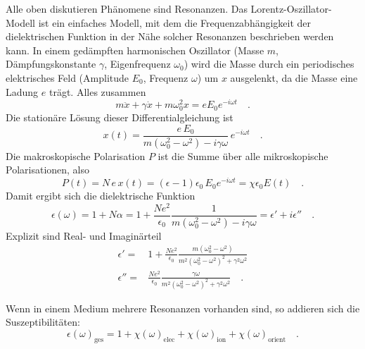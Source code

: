 Alle oben diskutieren Phänomene sind Resonanzen. Das Lorentz-Oszillator-Modell ist ein einfaches Modell, mit dem die Frequenzabhängigkeit der dielektrischen Funktion in der Nähe solcher Resonanzen beschrieben werden kann. In einem gedämpften harmonischen Oszillator (Masse $m$, Dämpfungskonstante $\gamma$, Eigenfrequenz $\omega_0$) wird die Masse durch ein periodisches elektrisches Feld (Amplitude $E_0$, Frequenz $\omega$) um $x$ ausgelenkt, da die Masse eine Ladung $e$ trägt. Alles zusammen
\begin{equation}
 m \ddot{x} +  \gamma \dot{x} + m \omega_0^2  x = e E_0 e^{- i \omega t} \quad .
\end{equation}
Die stationäre Lösung dieser Differentialgleichung ist
\begin{equation}
 x(t) =  \frac{e \, E_0}{m (\omega_0^2  - \omega^2) - i \gamma \omega} \, e^{- i \omega t} \quad .
\end{equation}
Die makroskopische Polarisation $P$ ist die Summe über alle mikroskopische Polarisationen, also
\begin{equation}
P(t) = N \, e \,x(t) =  (\epsilon -1 ) \epsilon_0 \, E_0 e^{- i \omega t}
= \chi \epsilon_0 E(t) \quad .
\end{equation}
Damit ergibt sich die dielektrische Funktion
\begin{equation}
\epsilon(\omega) = 1 + N \alpha = 1 +\frac{N e^2}{\epsilon_0} \frac{1}{m (\omega_0^2  - \omega^2) - i \gamma \omega} = \epsilon' + i \epsilon'' \quad .
\end{equation}
Explizit sind Real- und Imaginärteil
\begin{align}
 \epsilon' = & 1 + \frac{N e^2}{\epsilon_0} \frac{ m (\omega_0^2  - \omega^2)}{m^2 (\omega_0^2  - \omega^2)^2 +  \gamma^2 \omega^2}  \\
  \epsilon'' = &  \frac{N e^2}{\epsilon_0} \frac{ \gamma \omega }{m^2 (\omega_0^2  - \omega^2)^2 +  \gamma^2 \omega^2}  \quad .
\end{align}


Wenn in einem Medium mehrere Resonanzen vorhanden sind, so addieren sich die Suszeptibilitäten:
\begin{equation}
\epsilon(\omega)_\text{ges} = 1 + \chi(\omega)_\text{elec} +  \chi(\omega)_\text{ion}  + \chi(\omega)_\text{orient} \quad .
\end{equation}

\begin{marginfigure}

\caption{Addition der Suszeptibilitäten. \label{fig:diel_multiple_lorentz}}
\end{marginfigure}

